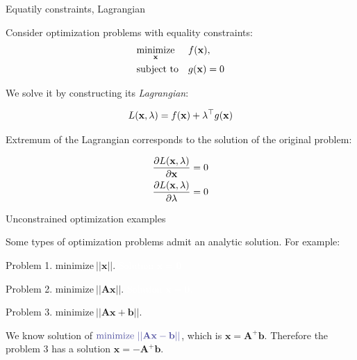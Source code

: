 \documentclass{beamer}
\begin{document}
\begin{frame}{Equatily constraints, Lagrangian}
	\begin{flushleft}
		
		Consider optimization problems with equality constraints:
		\begin{equation}
			\begin{aligned}
				& \underset{\mathbf{x}}{\text{minimize}}
				& & f(\mathbf{x}), \\
				& \text{subject to}
				& & g(\mathbf{x}) = 0
			\end{aligned}
		\end{equation}
		
		We solve it by constructing its \emph{Lagrangian}:
		
		\begin{equation}
			L(\mathbf{x}, \lambda) = f(\mathbf{x}) + \lambda^\top g(\mathbf{x})
		\end{equation}
		
		Extremum of the Lagrangian corresponds to the solution of the original problem:
		
		\begin{align}
			\frac{\partial L(\mathbf{x}, \lambda)}{\partial \mathbf{x}} = 0
			\\
			\frac{\partial L(\mathbf{x}, \lambda)}{\partial \lambda} = 0
		\end{align}
		
	\end{flushleft}
\end{frame}



\begin{frame}{Unconstrained optimization examples}
\begin{flushleft}
	

Some types of optimization problems admit an analytic solution. For example:
	

Problem 1. $\text{minimize} \ ||\mathbf{x}||$. \textcolor{white}{Solution $\mathbf{x} = \mathbf{0}$} 

\bigskip

Problem 2. $\text{minimize} \ ||\mathbf{A}\mathbf{x}||$. \textcolor{white}{Solution $\mathbf{x} = \mathbf{0}$.}

\bigskip

Problem 3. $\text{minimize} \ ||\mathbf{A}\mathbf{x} + \mathbf{b}||$. 

\bigskip

We know solution of $\textcolor{mydarkgray}{\text{minimize} \ ||\mathbf{A}\mathbf{x} - \mathbf{b}||}$, which is $\mathbf{x} = \mathbf{A}^+ \mathbf{b}$. Therefore the problem 3 has a solution $\mathbf{x} = -\mathbf{A}^+ \mathbf{b}$.
 
\end{flushleft}
\end{frame}
\end{document}
